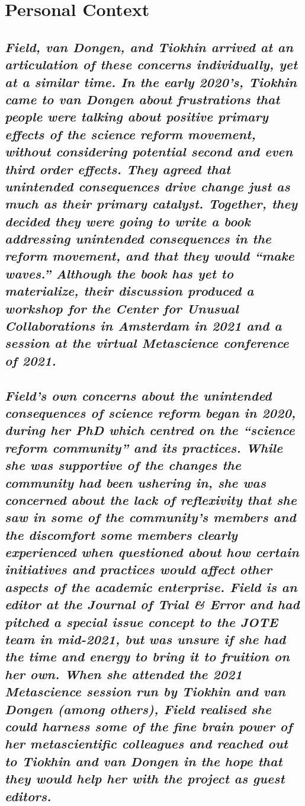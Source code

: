 \documentclass[authordate, editorial,noabstract]{jote-new-article}
\begin{document}
\section{Personal Context}



\subsection{\emph{Field, van Dongen, and Tiokhin arrived at an articulation of these concerns individually, yet at a similar time. In the early 2020's, Tiokhin came to van Dongen about frustrations that people were talking about positive primary effects of the science reform movement, without considering potential second and even third order effects. They agreed that unintended consequences drive change just as much as their primary catalyst. Together, they decided they were going to write a book addressing unintended consequences in the reform movement, and that they would “make waves.” Although the book has yet to materialize, their discussion produced a workshop for the Center for Unusual Collaborations in Amsterdam in 2021 and a session at the virtual Metascience conference of 2021. }}



\subsection{\emph{Field's own concerns about the unintended consequences of science reform began in 2020, during her PhD which centred on the “science reform community” and its practices. While she was supportive of the changes the community had been ushering in, she was concerned about the lack of reflexivity that she saw in some of the community's members and the discomfort some members clearly experienced when questioned about how certain initiatives and practices would affect other aspects of the academic enterprise. Field is an editor at the Journal of Trial \& Error and had pitched a special issue concept to the JOTE team in mid-}\emph{2021, but}\emph{ was unsure if she had the time and energy to bring it to fruition on her own. When she attended the 2021 Metascience session run by Tiokhin and van Dongen (among others), Field realised she could harness some of the fine brain power of her metascientific colleagues and reached out to Tiokhin and van Dongen in the hope that they would help her with the project as guest editors. }}
\end{document}
